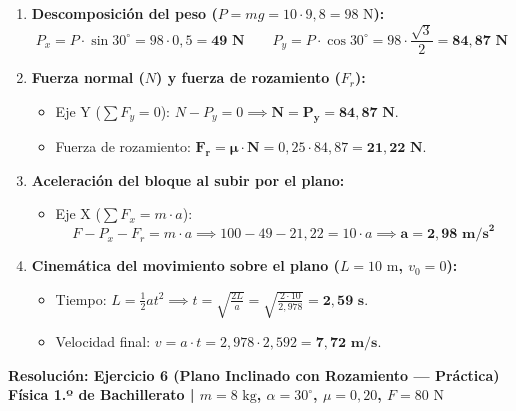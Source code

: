 ﻿\documentclass[11pt,a4paper]{article}
\begin{document}
\vspace{-0.1cm}
\begin{enumerate}[label=\textbf{\alph*)}, leftmargin=2em, itemsep=4pt]
    \item \textbf{Descomposición del peso ($P = mg = 10 \cdot 9{,}8 = 98\text{ N}$):}
    \[
    P_x = P \cdot \sin 30^\circ = 98 \cdot 0{,}5 = \mathbf{49\text{ N}} \qquad P_y = P \cdot \cos 30^\circ = 98 \cdot \frac{\sqrt{3}}{2} = \mathbf{84{,}87\text{ N}}
    \]

    \item \textbf{Fuerza normal ($N$) y fuerza de rozamiento ($F_r$):}
    \begin{itemize}[leftmargin=1.5em, itemsep=2pt]
        \item Eje Y ($\sum F_y = 0$): $N - P_y = 0 \implies \mathbf{N = P_y = 84{,}87\text{ N}}$.
        \item Fuerza de rozamiento: $\mathbf{F_r = \mu \cdot N} = 0{,}25 \cdot 84{,}87 = \mathbf{21{,}22\text{ N}}$.
    \end{itemize}

    \item \textbf{Aceleración del bloque al subir por el plano:}
    \begin{itemize}[leftmargin=1.5em, itemsep=2pt]
        \item Eje X ($\sum F_x = m \cdot a$):
        \[
        F - P_x - F_r = m \cdot a \implies 100 - 49 - 21{,}22 = 10 \cdot a \implies \mathbf{a = 2{,}98\text{ m/s}^2}
        \]
    \end{itemize}

    \item \textbf{Cinemática del movimiento sobre el plano ($L = 10\text{ m}$, $v_0 = 0$):}
    \begin{itemize}[leftmargin=1.5em, itemsep=2pt]
        \item Tiempo: $L = \frac{1}{2}at^2 \implies t = \sqrt{\frac{2L}{a}} = \sqrt{\frac{2 \cdot 10}{2{,}978}} = \mathbf{2{,}59\text{ s}}$.
        \item Velocidad final: $v = a \cdot t = 2{,}978 \cdot 2{,}592 = \mathbf{7{,}72\text{ m/s}}$.
    \end{itemize}
\end{enumerate}

\newpage

\begin{center}
    {\LARGE \textbf{Resolución: Ejercicio 6 (Plano Inclinado con Rozamiento — Práctica)}}\\[4pt]
    {\large \textbf{Física 1.º de Bachillerato | $m = 8\text{ kg}$, $\alpha = 30^\circ$, $\mu = 0{,}20$, $F = 80\text{ N}$}}
\end{center}
\end{document}
